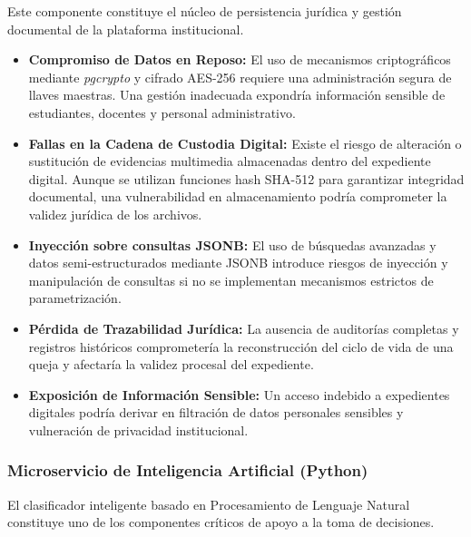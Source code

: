 \documentclass[12pt,oneside,letterpaper]{book}
\begin{document}
Este componente constituye el núcleo de persistencia jurídica y gestión documental de la plataforma institucional.

\begin{itemize}

\item \textbf{Compromiso de Datos en Reposo:}
El uso de mecanismos criptográficos mediante \textit{pgcrypto} y cifrado AES-256 requiere una administración segura de llaves maestras. Una gestión inadecuada expondría información sensible de estudiantes, docentes y personal administrativo.

\item \textbf{Fallas en la Cadena de Custodia Digital:}
Existe el riesgo de alteración o sustitución de evidencias multimedia almacenadas dentro del expediente digital. Aunque se utilizan funciones hash SHA-512 para garantizar integridad documental, una vulnerabilidad en almacenamiento podría comprometer la validez jurídica de los archivos.

\item \textbf{Inyección sobre consultas JSONB:}
El uso de búsquedas avanzadas y datos semi-estructurados mediante JSONB introduce riesgos de inyección y manipulación de consultas si no se implementan mecanismos estrictos de parametrización.

\item \textbf{Pérdida de Trazabilidad Jurídica:}
La ausencia de auditorías completas y registros históricos comprometería la reconstrucción del ciclo de vida de una queja y afectaría la validez procesal del expediente.

\item \textbf{Exposición de Información Sensible:}
Un acceso indebido a expedientes digitales podría derivar en filtración de datos personales sensibles y vulneración de privacidad institucional.

\end{itemize}


\subsubsection{Microservicio de Inteligencia Artificial (Python)}

El clasificador inteligente basado en Procesamiento de Lenguaje Natural constituye uno de los componentes críticos de apoyo a la toma de decisiones.
\end{document}
